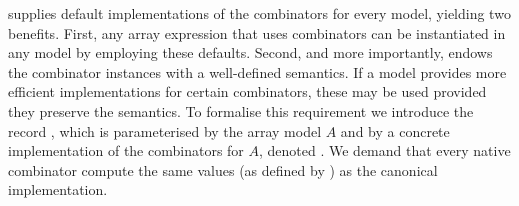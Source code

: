  supplies default implementations of the combinators for
every model, yielding two benefits.  First, any array expression that uses
combinators can be instantiated in any model by employing these defaults.
Second, and more importantly,  endows the combinator
instances with a well-defined semantics.  If a model provides more efficient
implementations for certain combinators, these may be used provided they
preserve the semantics.  To formalise this requirement we introduce the record
, which is parameterised by the array model $A$ and by a
concrete implementation of the combinators for $A$, denoted .  We
demand that every native combinator compute the same values (as defined by
) as the canonical implementation.
\begin{code}[hide]%
\>[0]\AgdaSpace{}%
\AgdaModule{\AgdaUnderscore{}}\AgdaSpace{}%
\AgdaSymbol{(}\AgdaSpace{}%
\AgdaSymbol{:}\AgdaSpace{}%
\AgdaSymbol{)}\AgdaSpace{}%
\AgdaSymbol{(}\AgdaSpace{}%
\AgdaSymbol{:}\AgdaSpace{}%
\AgdaSpace{}%
\AgdaSymbol{)}\AgdaSpace{}%
\<%
\\
\>[0][@{}l@{\AgdaIndent{0}}]%
\>[2]\AgdaSpace{}%
\AgdaSpace{}%
\<%
\\
%
\>[2]\AgdaSpace{}%
\AgdaSpace{}%
\<%
\\
%
\>[2]\AgdaSpace{}%
\AgdaSpace{}%
\AgdaSymbol{=}\AgdaSpace{}%
\AgdaSpace{}%
\<%
\\
%
\>[2]\AgdaSpace{}%
\AgdaSpace{}%
\AgdaSymbol{=}\AgdaSpace{}%
\AgdaSpace{}%
\AgdaSymbol{(}\AgdaSpace{}%
\AgdaSymbol{)}\<%
\\
%
\>[2]\AgdaSpace{}%
\<%
\\
\>[2][@{}l@{\AgdaIndent{0}}]%
\>[4]\AgdaSpace{}%
\AgdaSpace{}%
\AgdaSpace{}%
\AgdaSymbol{:}\AgdaSpace{}%
\<%
\\
%
\>[4]\AgdaSpace{}%
%
\>[9]\AgdaSymbol{:}\AgdaSpace{}%
\<%
\\
%
\>[4]\AgdaSpace{}%
\AgdaSymbol{:}\AgdaSpace{}%
\<%

\end{code}
